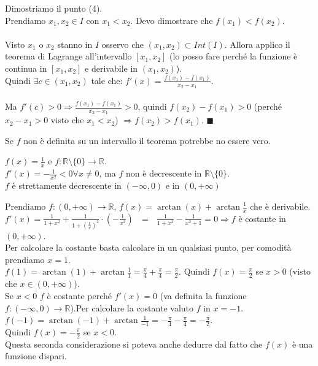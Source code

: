 \begin{demostration}
Dimostriamo il punto (4).\\
Prendiamo $x_1, x_2 \in I$ con $x_1 < x_2$. Devo dimostrare che $f(x_1) < f(x_2)$.\\\\
Visto $x_1$ o $x_2$ stanno in $I$ osservo che $(x_1,x_2) \subset Int(I)$. Allora applico il teorema di Lagrange all'intervallo $[x_1,x_2]$ (lo posso fare perché la funzione è continua in $[x_1,x_2]$ e derivabile in $(x_1,x_2)$).\\
Quindi $\exists c \in (x_1,x_2) $ tale che: $f'(x) = \frac{f(x_1) - f(x_1)}{x_2 - x_1}$.\\\\
Ma $f'(c) > 0 \Longrightarrow \frac{f(x_1) - f(x_1)}{x_2 - x_1} > 0$, quindi $f(x_2) - f(x_1) > 0$ (perché  $x_2 - x_1 > 0$ visto che $x_1 < x_2$) $\Longrightarrow f(x_2) > f(x_1)$. $\blacksquare$
\end{demostration}

\begin{observation}
Se $f$ non è definita su un intervallo il teorema potrebbe no essere vero.
\end{observation}

\begin{example}
$f(x) = \frac{1}{x}$ e $f: \mathbb{R} \setminus \{0\} \to \mathbb{R}$.\\
$f'(x) = -\frac{1}{x^2} < 0 \forall x \neq 0$, ma $f$ non è decrescente in $\mathbb{R} \setminus \{0\}$.\\
$f$ è strettamente decrescente in $(-\infty, 0)$ e in $(0, +\infty)$
\end{example}

\begin{example}
Prendiamo $f: (0, +\infty) \to \mathbb{R}$, $f(x) = \arctan(x) + \arctan\frac{1}{x}$ che è derivabile.\\
$f'(x) = \frac{1}{1 + x^2} + \frac{1}{1 + (\frac{1}{x})^2} \cdot (-\frac{1}{x^2}) \:\:\:=\:\:\: \frac{1}{1 + x^2} - \frac{1}{x^2 + 1} = 0 \Longrightarrow f$ è costante in $(0,+\infty)$.\\
Per calcolare la costante basta calcolare in un qualsiasi punto, per comodità prendiamo $x = 1$.\\
$f(1) = \arctan(1) + \arctan\frac{1}{1} = \frac{\pi}{4} + \frac{\pi}{4} = \frac{\pi}{2}$. Quindi $f(x) = \frac{\pi}{2}$ se $x > 0$ (visto che $x \in (0,+\infty)$).\\
Se $x < 0$ $f$ è costante perché $f'(x) = 0$ (va definita la funzione $f:(-\infty, 0) \to \mathbb{R}$).Per calcolare la costante valuto $f$ in $x = -1$.
$f(-1) = \arctan(-1) + \arctan\frac{1}{-1} = -\frac{\pi}{4} - \frac{\pi}{4} = -\frac{\pi}{2}$. \\Quindi $f(x) = -\frac{\pi}{2}$ se $x < 0$.\\
Questa seconda considerazione si poteva anche dedurre dal fatto che $f(x)$ è una funzione dispari.
\end{example}

